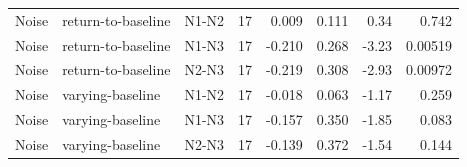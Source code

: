 \begin{tabular}{lllrrrrr}
Noise & return-to-baseline & N1-N2 & 17 & 0.009 & 0.111 & 0.34 & 0.742 \\
Noise & return-to-baseline & N1-N3 & 17 & -0.210 & 0.268 & -3.23 & 0.00519 \\
Noise & return-to-baseline & N2-N3 & 17 & -0.219 & 0.308 & -2.93 & 0.00972 \\
Noise & varying-baseline & N1-N2 & 17 & -0.018 & 0.063 & -1.17 & 0.259 \\
Noise & varying-baseline & N1-N3 & 17 & -0.157 & 0.350 & -1.85 & 0.083 \\
Noise & varying-baseline & N2-N3 & 17 & -0.139 & 0.372 & -1.54 & 0.144 \\
\bottomrule
\end{tabular}
